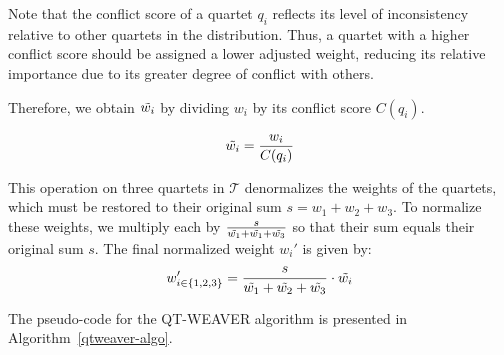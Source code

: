 \documentclass[10pt,a4paper]{article}
\newcommand{\addb}[1]{{\color{red} #1}}
\begin{document}

Note that the conflict score of a quartet $q_i$ reflects its level of inconsistency relative to other quartets in the distribution. Thus, a quartet with a higher conflict score should be assigned a lower adjusted weight, reducing its relative importance due to its greater degree of conflict with others.


Therefore, we obtain $\Tilde{w_i}$ by dividing $ w_i $ %
by its conflict score $C(q_i)$.

$$
\Tilde{w_i} = \frac{w_i}{C(q_i)}
$$

This operation on three quartets in $\mathcal{T}$ denormalizes the weights of the quartets, which must be restored to their original sum $s = w_1+w_2+w_3$. %
To normalize these weights, we multiply each by $\frac{s}{\Tilde{w_1} + \Tilde{w_1} + \Tilde{w_3}}$ so that their sum equals their original sum $s$. The final normalized weight $w_i'$ is given by:
$$
w_{i \in \{1,2,3\}}'  = \frac{ s }{\Tilde{w_1} + \Tilde{w_2} + \Tilde{w_3}} \cdot \Tilde{w_i}
$$


The pseudo-code for the QT-WEAVER algorithm is presented in Algorithm~\ref{qtweaver-algo}.

% 

\normalem %

\IncMargin{1em}
\end{document}
